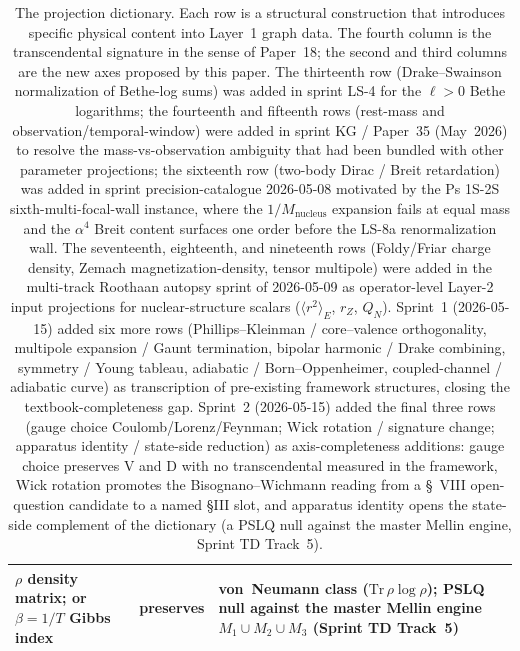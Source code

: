 \documentclass[11pt]{article}
\begin{document}
\begin{table}[h]
\begin{tabular}{p{3.5cm} p{3cm} p{2cm} p{4cm}}
$\rho$ density matrix; or $\beta = 1/T$ Gibbs index & preserves &
von~Neumann class ($\mathrm{Tr}\,\rho\log\rho$); PSLQ null against the
master Mellin engine $M_1\cup M_2\cup M_3$ (Sprint TD Track~5) \\
\bottomrule
\end{tabular}
\caption{The projection dictionary.  Each row is a structural
construction that introduces specific physical content into Layer~1
graph data.  The fourth column is the transcendental signature in
the sense of Paper~18; the second and third columns are the new
axes proposed by this paper.  The thirteenth row (Drake--Swainson
normalization of Bethe-log sums) was added in sprint LS-4 for the
$\ell > 0$ Bethe logarithms; the fourteenth and
fifteenth rows (rest-mass and observation/temporal-window) were
added in sprint KG / Paper~35 (May~2026) to resolve the
mass-vs-observation ambiguity that had been bundled with other
parameter projections; the sixteenth row (two-body Dirac / Breit
retardation) was added in sprint precision-catalogue 2026-05-08
motivated by the Ps 1S-2S sixth-multi-focal-wall instance, where
the $1/M_\text{nucleus}$ expansion fails at equal mass and the
$\alpha^4$ Breit content surfaces one order before the LS-8a
renormalization wall.  The seventeenth, eighteenth, and nineteenth
rows (Foldy/Friar charge density, Zemach magnetization-density,
tensor multipole) were added in the multi-track Roothaan autopsy
sprint of 2026-05-09 as operator-level Layer-2 input projections for
nuclear-structure scalars ($\langle r^2\rangle_E$, $r_Z$, $Q_N$).
Sprint~1 (2026-05-15) added six more rows
(Phillips--Kleinman / core--valence orthogonality, multipole expansion
/ Gaunt termination, bipolar harmonic / Drake combining, symmetry /
Young tableau, adiabatic / Born--Oppenheimer, coupled-channel /
adiabatic curve) as transcription of pre-existing framework
structures, closing the textbook-completeness gap.  Sprint~2
(2026-05-15) added the final three rows (gauge choice
Coulomb/Lorenz/Feynman; Wick rotation / signature change; apparatus
identity / state-side reduction) as axis-completeness additions:
gauge choice preserves V and D with no transcendental measured in the
framework, Wick rotation promotes the Bisognano--Wichmann reading from a \S~VIII
open-question candidate to a named §III slot, and apparatus identity
opens the state-side complement of the dictionary (a PSLQ null
against the master Mellin engine, Sprint TD Track~5).}
\label{tab:projection_axes}
\end{table}
\end{document}
